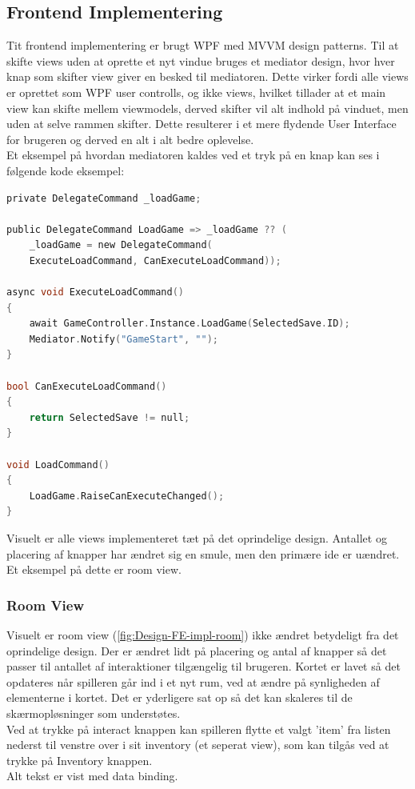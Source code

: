 \subsection{Frontend Implementering}
\label{Sec:FE-Implementering}
Tit frontend implementering er brugt WPF med MVVM design patterns.
Til at skifte views uden at oprette et nyt vindue bruges et mediator design, hvor hver knap som skifter view giver en besked til mediatoren. Dette virker fordi alle views er oprettet som WPF user controlls, og ikke views, hvilket tillader at et main view kan skifte mellem viewmodels, derved skifter vil alt indhold på vinduet, men uden at selve rammen skifter. Dette resulterer i et mere flydende User Interface for brugeren og derved en alt i alt bedre oplevelse. \cite{Mediator}\\
Et eksempel på hvordan mediatoren kaldes ved et tryk på en knap kan ses i følgende kode eksempel:

\begin{lstlisting}[language=c]
private DelegateCommand _loadGame;
    
public DelegateCommand LoadGame => _loadGame ?? (
	_loadGame = new DelegateCommand(
	ExecuteLoadCommand, CanExecuteLoadCommand));

async void ExecuteLoadCommand()
{
    await GameController.Instance.LoadGame(SelectedSave.ID);
    Mediator.Notify("GameStart", "");
}

bool CanExecuteLoadCommand()
{
    return SelectedSave != null;
}

void LoadCommand()
{
    LoadGame.RaiseCanExecuteChanged();
}
\end{lstlisting}

Visuelt er alle views implementeret tæt på det oprindelige design. Antallet og placering af knapper har ændret sig en smule, men den primære ide er uændret. Et eksempel på dette er room view.

\subsubsection{Room View}

Visuelt er room view (\autoref{fig:Design-FE-impl-room}) ikke ændret betydeligt fra det oprindelige design. Der er ændret lidt på placering og antal af knapper så det passer til antallet af interaktioner tilgængelig til brugeren. Kortet er lavet så det  opdateres når spilleren går ind i et nyt rum, ved at ændre på synligheden af elementerne i kortet. Det er yderligere sat op så det kan skaleres til de skærmopløsninger som understøtes.\\
Ved at trykke på interact knappen kan spilleren flytte et valgt 'item' fra listen nederst til venstre over i sit inventory (et seperat view), som kan tilgås ved at trykke på Inventory knappen.\\
Alt tekst er vist med data binding.

